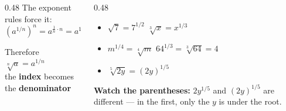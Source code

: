 \documentclass[aspectratio=169, 11pt]{beamer}
\begin{document}
\begin{frame}[t, plain]
  \begin{columns}[T]
    \begin{column}{0.48\textwidth}
      The exponent rules force it:
      \[ \left(a^{1/n}\right)^{n} = a^{\frac{1}{n}\cdot n} = a^{1} = a \]
      \vspace{-4pt}
      \begin{block}{Therefore}
        \centering $\displaystyle \sqrt[n]{a} = a^{1/n}$ \\[3pt]
        {\footnotesize the \textbf{index} becomes the \textbf{denominator}}
      \end{block}
    \end{column}
    \begin{column}{0.48\textwidth}
      \footnotesize
      \begin{itemize}\setlength{\itemsep}{5pt}
        \item $\sqrt{7}=7^{1/2}$ \qquad $\sqrt[3]{x}=x^{1/3}$
        \item $m^{1/4}=\sqrt[4]{m}$ \qquad $64^{1/3}=\sqrt[3]{64}=4$
        \item $\sqrt[5]{2y}=(2y)^{1/5}$
      \end{itemize}
      \vspace{5pt}
      {\footnotesize \textbf{Watch the parentheses:} $2y^{1/5}$ and $(2y)^{1/5}$ are different --- in
      the first, only the $y$ is under the root.}
    \end{column}
  \end{columns}
\end{frame}
\end{document}
